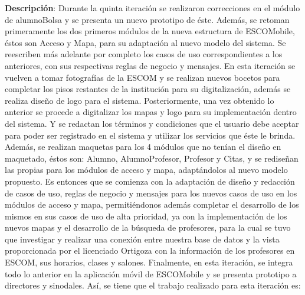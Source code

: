\noindent
\textbf{Descripción}: Durante la quinta iteración se realizaron correcciones en el módulo de alumnoBolsa y se presenta un nuevo prototipo de éste. Además, se retoman primeramente los dos primeros módulos de la nueva estructura de ESCOMobile, éstos son Acceso y Mapa, para su adaptación al nuevo modelo del sistema. Se reescriben más adelante por completo los casos de uso correspondientes a los anteriores, con sus respectivas reglas de negocio y mensajes.
\newline
En esta iteración se vuelven a tomar fotografías de la ESCOM y se realizan nuevos bocetos para completar los pisos restantes de la institución para su digitalización, además se realiza diseño de logo para el sistema. Posteriormente, una vez obtenido lo anterior se procede a digitalizar los mapas y logo para su implementación dentro del sistema. Y se redactan los términos y condiciones que el usuario debe aceptar para poder ser registrado en el sistema y utilizar los servicios que éste le brinda. 
\newline
\newline
Además, se realizan maquetas para los 4 módulos que no tenían el diseño en maquetado, éstos son: Alumno, AlumnoProfesor, Profesor y Citas, y se rediseñan las propias para los módulos de acceso y mapa, adaptándolos al nuevo modelo propuesto. 
\newline
Es entonces que se comienza con la adaptación de diseño y redacción de casos de uso, reglas de negocio y mensajes para los nuevos casos de uso en los módulos de acceso y mapa, permitiéndonos además completar el desarrollo de los mismos en sus casos de uso de alta prioridad, ya con la implementación de los nuevos mapas y el desarrollo de la búsqueda de profesores, para la cual se tuvo que investigar y realizar una conexión entre nuestra base de datos y la vista proporcionada por el licenciado Ortigoza con la información de los profesores en ESCOM, sus horarios, clases y salones.
\newline
Finalmente, en esta iteración, se integra todo lo anterior en la aplicación móvil de ESCOMobile y se presenta prototipo a directores y sinodales.
\newline
Así, se tiene que el trabajo realizado para esta iteración es: 
